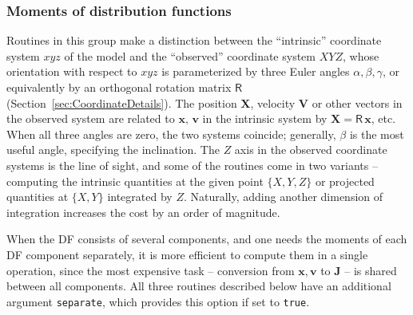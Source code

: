 \documentclass[12pt]{article}
\newcommand{\ppp}[1]{\textcolor{darkolive} {\texttt{#1}}}
\newcommand{\bv}{\boldsymbol{v}}
\newcommand{\bx}{\boldsymbol{x}}
\newcommand{\bX}{\boldsymbol{X}}
\newcommand{\bV}{\boldsymbol{V}}
\newcommand{\bJ}{\boldsymbol{J}}
\begin{document}
\subsubsection{Moments of distribution functions}  \label{sec:Moments}

Routines in this group make a distinction between the ``intrinsic'' coordinate system $xyz$ of the model and the ``observed'' coordinate system $XYZ$, whose orientation with respect to $xyz$ is parameterized by three Euler angles $\alpha,\beta,\gamma$, or equivalently by an orthogonal rotation matrix $\mathsf R$ (Section~\ref{sec:CoordinateDetails}). The position $\bX$, velocity $\bV$ or other vectors in the observed system are related to $\bx,\,\bv$ in the intrinsic system by $\bX = \mathsf R\,\bx$, etc. When all three angles are zero, the two systems coincide; generally, $\beta$ is the most useful angle, specifying the inclination. The $Z$ axis in the observed coordinate systems is the line of sight, and some of the routines come in two variants -- computing the intrinsic quantities at the given point $\{X,Y,Z\}$ or projected quantities at $\{X,Y\}$ integrated by $Z$. Naturally, adding another dimension of integration increases the cost by an order of magnitude.

When the DF consists of several components, and one needs the moments of each DF component separately, it is more efficient to compute them in a single operation, since the most expensive task -- conversion from $\bx,\bv$ to $\bJ$ -- is shared between all components. All three routines described below have an additional argument \ppp{separate}, which provides this option if set to \texttt{true}.
\end{document}
